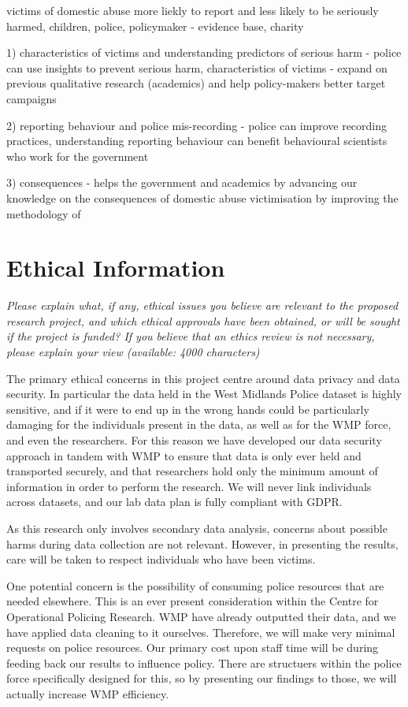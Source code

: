 \documentclass[11pt, a4paper]{article}
\begin{document}
victims of domestic abuse more liekly to report and less likely to be seriously harmed, children, police, policymaker - evidence base, charity

1) characteristics of victims and understanding predictors of serious harm - police can use insights to prevent serious harm, characteristics of victims - expand on previous qualitative research (academics) and help policy-makers better target campaigns

2) reporting behaviour and police mis-recording - police can improve recording practices, understanding reporting behaviour can benefit behavioural scientists who work for the government

3) consequences - helps the government and academics by advancing our knowledge on the consequences of domestic abuse victimisation by improving the methodology of
  
  
  

\section{Ethical Information}

\textit{Please explain what, if any, ethical issues you believe are relevant to the proposed research project, and which ethical approvals have been obtained, or will be sought if the project is funded? If you believe that an ethics review is not necessary, please explain your view (available: 4000 characters)}

The primary ethical concerns in this project centre around data privacy and data security. In particular the data held in the West Midlands Police dataset is highly sensitive, and if it were to end up in the wrong hands could be particularly damaging for the individuals present in the data, as well as for the WMP force, and even the researchers. For this reason we have developed our data security approach in tandem with WMP to ensure that data is only ever held and transported securely, and that researchers hold only the minimum amount of information in order to perform the research. We will never link individuals across datasets, and our lab data plan is fully compliant with GDPR.

As this research only involves secondary data analysis, concerns about possible harms during data collection are not relevant. However, in presenting the results, care will be taken to respect individuals who have been victims.

One potential concern is the possibility of consuming police resources that are needed elsewhere. This is an ever present consideration within the Centre for Operational Policing Research. WMP have already outputted their data, and we have applied data cleaning to it ourselves. Therefore, we will make very minimal requests on police resources. Our primary cost upon staff time will be during feeding back our results to influence policy. There are structuers within the police force specifically designed for this, so by presenting our findings to those, we will actually increase WMP efficiency.
\end{document}
